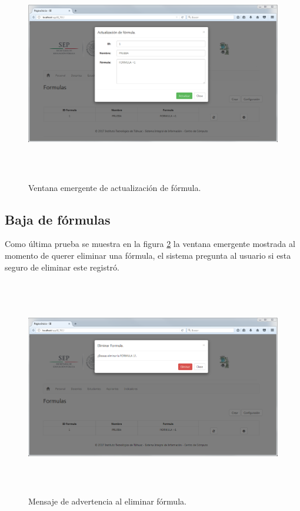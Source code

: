 			\begin{figure}[]
		        \centering
		        \includegraphics[width=16cm, height=9.5cm]{figuras/FormulasActualiza}
		        \caption{Ventana emergente de actualizaci\'on de f\'ormula.}
		        \label{fig_FormulasActualiza}
		    \end{figure}

		    \subsection{Baja de f\'ormulas}

		    Como \'ultima prueba se muestra en la figura \ref{fig_FormulasElimina} la ventana emergente mostrada al momento de querer eliminar una f\'ormula, el sistema pregunta al usuario si esta seguro de eliminar este registr\'o.\\

		    \begin{figure}[]
		        \centering
		        \includegraphics[width=16cm, height=9.5cm]{figuras/FormulasElimina}
		        \caption{Mensaje de advertencia al eliminar f\'ormula.}
		        \label{fig_FormulasElimina}
		    \end{figure}








